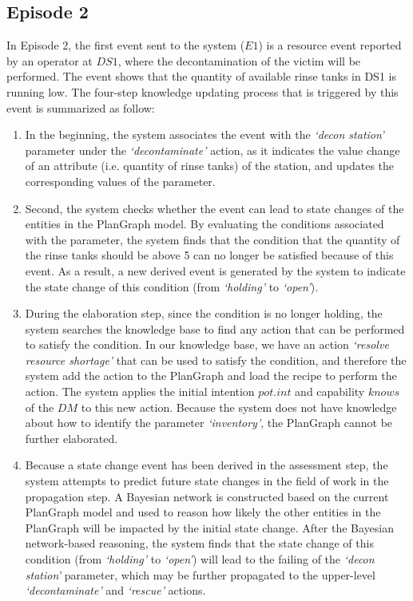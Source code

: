 \subsection{Episode 2} %
\label{sub:episode_2}
In Episode 2, the first event sent to the system ($E1$) is a resource event reported by an operator at $DS1$, where the decontamination of the victim will be performed. The event shows that the quantity of available rinse tanks in DS1 is running low. The four-step knowledge updating process that is triggered by this event is summarized as follow:

\begin{enumerate}
	\item In the beginning, the system associates the event with the \emph{`decon station'} parameter under the \emph{`decontaminate'} action, as it indicates the value change of an attribute (i.e. quantity of rinse tanks) of the station, and updates the corresponding values of the parameter.
	\item Second, the system checks whether the event can lead to state changes of the entities in the PlanGraph model. By evaluating the conditions associated with the parameter, the system finds that the condition that the quantity of the rinse tanks should be above 5 can no longer be satisfied because of this event. As a result, a new derived event is generated by the system to indicate the state change of this condition (from \emph{`holding'} to \emph{`open'}).
	\item During the elaboration step, since the condition is no longer holding, the system searches the knowledge base to find any action that can be performed to satisfy the condition. In our knowledge base, we have an action \emph{`resolve resource shortage'} that can be used to satisfy the condition, and therefore the system add the action to the PlanGraph and load the recipe to perform the action. The system applies the initial intention $pot.int$ and capability $knows$ of the $DM$ to this new action. Because the system does not have knowledge about how to identify the parameter \emph{`inventory'}, the PlanGraph cannot be further elaborated.
	\item Because a state change event has been derived in the assessment step, the system attempts to predict future state changes in the field of work in the propagation step. A Bayesian network is constructed based on the current PlanGraph model and used to reason how likely the other entities in the PlanGraph will be impacted by the initial state change. After the Bayesian network-based reasoning, the system finds that the state change of this condition (from \emph{`holding'} to \emph{`open'}) will lead to the failing of the \emph{`decon station'} parameter, which may be further propagated to the upper-level \emph{`decontaminate'} and \emph{`rescue'} actions.
\end{enumerate}

